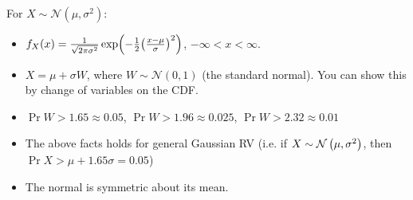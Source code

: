 \begin{note}
    For $X \sim \mathcal{N}(\mu, \sigma^2)$:
    \begin{itemize}
        \item $f_X(x) = \frac{1}{\sqrt{2 \pi \sigma^2}}\exp(-\frac{1}{2}\qty(\frac{x - \mu}{\sigma})^2)$, $-\infty < x < \infty$.
        \item $X = \mu + \sigma W$, where $W \sim \mathcal{N}(0, 1)$ (the standard normal). You can show this by change of variables on the CDF.
        \item $\Pr{W > 1.65} \approx 0.05$, $\Pr{W > 1.96} \approx 0.025$, $\Pr{W > 2.32} \approx 0.01$
        \item The above facts holds for general Gaussian RV (i.e. if $X \sim \mathcal{N}\left( \mu, \sigma^2 \right)$, then $\Pr{X > \mu + 1.65 \sigma} = 0.05$)
        \item The normal is symmetric about its mean.
    \end{itemize}
\end{note}

